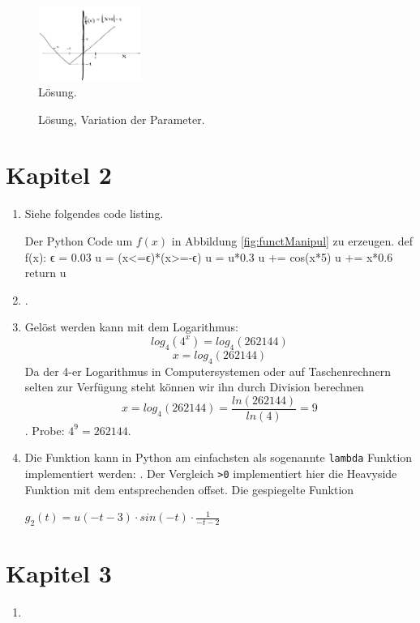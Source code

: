 \begin{figure}[h]
    \centering
    \includegraphics[width=0.3\textwidth]{img/loesung_abs.png}
    \caption{Lösung. }
    \label{fig:Loes_abs}
\end{figure}

\begin{figure}[h]
    \centering
    
    \caption{Lösung, Variation der Parameter.}
    \label{fig:Loes_abs_var}
\end{figure}



\section{Kapitel 2}
\begin{enumerate}
\item Siehe folgendes code listing.
\begin{python}{Der Python Code um $f(x)$ in Abbildung \ref{fig:functManipul} zu erzeugen.}
def f(x):
    ϵ = 0.03
    u = (x<=ϵ)*(x>=-ϵ)
    u = u*0.3
    u += cos(x*5)
    u += x*0.6
    return u

\end{python}
\item {}.

\item Gelöst werden kann mit dem Logarithmus:
$$ log_4(4^x) = log_4(262144)$$
 $$ x = log_4(262144)$$
 Da der 4-er Logarithmus in Computersystemen oder auf Taschenrechnern selten zur Verfügung steht können wir ihn durch Division berechnen  
 $$ x = log_4(262144) = \frac{ln(262144)}{ln(4)} = 9$$.
 Probe: $4^9 = 262144$.

\item Die Funktion kann in Python am einfachsten als sogenannte \texttt{lambda} Funktion implementiert werden: . Der Vergleich \texttt{>0} implementiert hier die Heavyside Funktion mit dem entsprechenden offset. Die gespiegelte Funktion

  $g_2(t) = u(-t-3) \cdot sin(-t) \cdot \frac{1}{-t-2}$

\end{enumerate}

\section{Kapitel 3}
\begin{enumerate}
\item
\end{enumerate}

